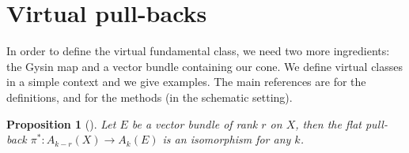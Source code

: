 \documentclass[pdftex]{sigma}
\numberwithin{equation}{section}
\newtheorem{Proposition}[Theorem]{Proposition}
 { \theoremstyle{definition}
\newtheorem{Definition}[Theorem]{Definition}
\newtheorem{Note}[Theorem]{Note}
\newtheorem{Example}[Theorem]{Example}
\newtheorem{Remark}[Theorem]{Remark}
\newtheorem{notation}[Theorem]{Notation}
\newtheorem{construction}[Theorem]{Construction}
}
\begin{document}
\section{Virtual pull-backs}\label{gysinmorphism}
In order to define the virtual fundamental class, we need two more ingredients: the Gysin map and a vector bundle containing our cone. We define virtual classes in a simple context and we give examples. The main references are \cite{vir-pull} for the definitions, and \cite[Chapters 5 and 6]{Fulton} for the methods (in the schematic setting).

\begin{Proposition}[{{\cite[Theorem 3.3]{Fulton}}}] Let $E$ be a vector bundle of rank $r$ on $X$, then
the flat pull-back $\pi^*\colon A_{k-r}(X)\to A_k(E)$ is an isomorphism for any $k$.
\end{Proposition}
\end{document}
